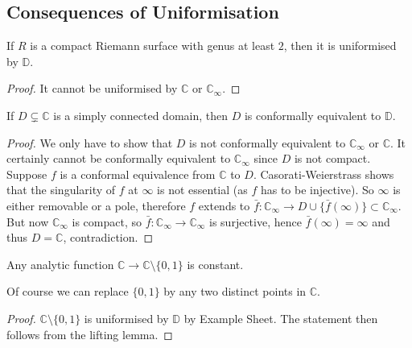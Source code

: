 \subsection{Consequences of Uniformisation}
\begin{corollary}
    If $R$ is a compact Riemann surface with genus at least $2$, then it is uniformised by $\mathbb D$.
\end{corollary}
\begin{proof}
    It cannot be uniformised by $\mathbb C$ or $\mathbb C_\infty$.
\end{proof}
\begin{corollary}
    If $D\subsetneq\mathbb C$ is a simply connected domain, then $D$ is conformally equivalent to $\mathbb D$.
\end{corollary}
\begin{proof}
    We only have to show that $D$ is not conformally equivalent to $\mathbb C_\infty$ or $\mathbb C$.
    It certainly cannot be conformally equivalent to $\mathbb C_\infty$ since $D$ is not compact.
    Suppose $f$ is a conformal equivalence from $\mathbb C$ to $D$.
    Casorati-Weierstrass shows that the singularity of $f$ at $\infty$ is not essential (as $f$ has to be injective).
    So $\infty$ is either removable or a pole, therefore $f$ extends to $\bar{f}:\mathbb C_\infty\to D\cup\{\bar{f}(\infty)\}\subset\mathbb C_\infty$.
    But now $\mathbb C_\infty$ is compact, so $\bar{f}:\mathbb C_\infty\to\mathbb C_\infty$ is surjective, hence $\bar{f}(\infty)=\infty$ and thus $D=\mathbb C$, contradiction.
\end{proof}
\begin{corollary}
    Any analytic function $\mathbb C\to\mathbb C\setminus\{0,1\}$ is constant.
\end{corollary}
Of course we can replace $\{0,1\}$ by any two distinct points in $\mathbb C$.
\begin{proof}
    $\mathbb C\setminus\{0,1\}$ is uniformised by $\mathbb D$ by Example Sheet.
    The statement then follows from the lifting lemma.
\end{proof}